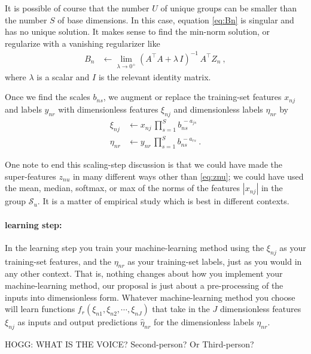 \documentclass{article}
\newcommand{\set}[1]{\mathcal{#1}}
\newcommand{\setS}{\set{S}}
\begin{document}
It is possible of course that the number $U$ of unique groups can be smaller than the number $S$ of base dimensions.
In this case, equation \eqref{eq:Bn} is singular and has no unique solution.
It makes sense to find the min-norm solution, or regularize with a vanishing regularizer like
\begin{align}\label{eq:Bn}
    B_n &\leftarrow \lim_{\lambda\rightarrow 0^+} (A^\top A + \lambda\,I)^{-1}\,A^\top Z_n ~,
\end{align}
where $\lambda$ is a scalar and $I$ is the relevant identity matrix.
 
Once we find the scales $b_{ns}$, we augment or replace the training-set features $x_{nj}$ and labels $y_{nr}$ with dimensionless features $\xi_{nj}$ and dimensionless labels $\eta_{nr}$ by
\begin{align}
    \xi_{nj}  &\leftarrow x_{nj}\,\prod_{s=1}^S b_{ns}^{\,-a_{js}} \\
    \eta_{nr} &\leftarrow y_{nr}\,\prod_{s=1}^S b_{ns}^{\,-a_{rs}} ~.
\end{align}

One note to end this scaling-step discussion is that we could have made the super-features $z_{nu}$ in many different ways other than \eqref{eq:znu}; we could have used the mean, median, softmax, or max of the norms of the features $|x_{nj}|$ in the group $\setS_u$.
It is a matter of empirical study which is best in different contexts.

\paragraph{learning step:}
In the learning step you train your machine-learning method using the $\xi_{nj}$ as your training-set features, and the $\eta_{nr}$ as your training-set labels, just as you would in any other context.
That is, nothing changes about how you implement your machine-learning method, our proposal is just about a pre-processing of the inputs into dimensionless form.
Whatever machine-learning method you choose will learn functions $f_r(\xi_{n1}, \xi_{n2}, \cdots, \xi_{nJ})$ that take in the $J$ dimensionless features $\xi_{nj}$ as inputs and output predictions $\hat{\eta}_{nr}$ for the dimensionless labels $\eta_{nr}$.

HOGG: WHAT IS THE VOICE? Second-person? Or Third-person?
\end{document}
